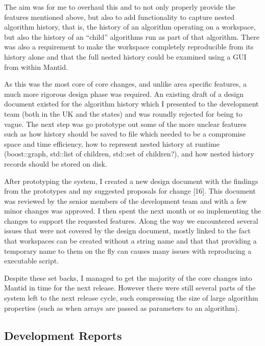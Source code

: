 \documentclass[paper=a4, fontsize=11pt]{scrartcl}	%
\numberwithin{equation}{section}															%
\numberwithin{figure}{section}																%
\numberwithin{table}{section}
\begin{document}
The aim was for me to overhaul this and to not only properly provide the
features mentioned above, but also to add functionality to capture
nested algorithm history, that is, the history of an algorithm operating
on a workspace, but also the history of an ``child'' algorithms run as
part of that algorithm. There was also a requirement to make the
workspace completely reproducible from its history alone and that the
full nested history could be examined using a GUI from within Mantid.

As this was the most core of core changes, and unlike area specific
features, a much more rigorous design phase was required. An existing
draft of a design document existed for the algorithm history which I
presented to the development team (both in the UK and the states) and
was roundly rejected for being to vague. The next step was go prototype
out some of the more unclear features such as how history should be
saved to file which needed to be a compromise space and time efficiency,
how to represent nested history at runtime (boost::graph, std::list of
children, std::set of children?), and how nested history records should
be stored on disk.

After prototyping the system, I created a new design document with the
findings from the prototypes and my suggested proposals for change
{[}16{]}. This document was reviewed by the senior members of the
development team and with a few minor changes was approved. I then spent
the next month or so implementing the changes to support the requested
features. Along the way we encountered several issues that were not
covered by the design document, mostly linked to the fact that
workspaces can be created without a string name and that that providing
a temporary name to them on the fly can causes many issues with
reproducing a executable script.

Despite these set backs, I managed to get the majority of the core
changes into Mantid in time for the next release. However there were
still several parts of the system left to the next release cycle, such
compressing the size of large algorithm properties (such as when arrays
are passed as parameters to an algorithm).

\subsection{Development Reports}\label{development-reports}
\end{document}
